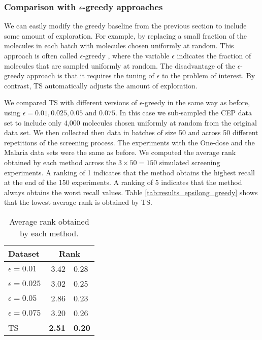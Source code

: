\subsubsection{Comparison with $\epsilon$-greedy approaches}

We can easily modify the greedy baseline from the previous section to include some amount of exploration. For example, by replacing a small fraction of the molecules in each batch with molecules chosen uniformly at random. This approach is often called $\epsilon$-greedy \cite{watkins1989learning}, where the variable $\epsilon$ indicates the fraction of molecules that are sampled uniformly at random. The disadvantage of the $\epsilon$-greedy approach is that it requires the tuning of $\epsilon$ to the problem of interest. By contrast, TS automatically adjusts the amount of exploration. 

We compared TS with different versions of $\epsilon$-greedy in the same way as before, using $\epsilon = 0.01, 0.025, 0.05$ and $0.075$. In this case we sub-sampled the CEP data set to include only 4,000 molecules chosen uniformly at random from the original data set. We then collected then data in batches of size 50 and across 50 different repetitions of the screening process. The experiments with the One-dose and the Malaria data sets were the same as before.  We computed the average rank obtained by each method across the $3\times 50 = 150$ simulated screening experiments. A ranking of 1 indicates that the method obtains the highest recall at the end of the 150 experiments. A ranking of 5 indicates that the method always obtains the worst recall values. Table \ref{tab:results_epsilong_greedy} shows that the lowest average rank is obtained by TS. 

\begin{table}
\centering
\caption{Average rank obtained by each method.}\label{tab:results_epsilon_greedy}
\begin{tabular}{lr@{$\pm$}l}
\hline
\bf{Dataset}& \multicolumn{2}{c}{\bf{Rank}}\\
\hline
$\epsilon = 0.01$ & 3.42 & 0.28 \\
$\epsilon = 0.025$ & 3.02 & 0.25 \\
$\epsilon = 0.05$ & 2.86 & 0.23 \\
$\epsilon = 0.075$ & 3.20 & 0.26 \\
TS & \bf{ 2.51 }&\bf{ 0.20 } \\
\hline
\end{tabular}
\end{table}
